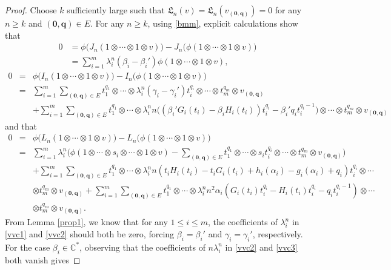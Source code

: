 \documentclass[12pt,leqno,amscd,amsfonts,amssymb]{amsart}
\def\a{\alpha}
\def\b{\beta}
\def\r{\gamma}
\def\C{\mathbb{C}}
\numberwithin{equation}{section}
\begin{document}
\begin{proof}
Choose  $k$ sufficiently large such that $\mathfrak L_n(v)=\mathfrak L_n(v_{(\mathbf{0}, \mathbf{q})})=0$ for any $n\geq k$ and $(\mathbf{0}, \mathbf{q})\in E$. For any $n\geq k$,  using \eqref{bmm}, explicit calculations show that    
\begin{align}\label{vvc1}
0&=\phi\big(J_n(1\otimes\cdots \otimes1 \otimes v)\big)-J_n\big(\phi(1\otimes\cdots \otimes1 \otimes v)\big)\nonumber\\
&=\sum_{i=1}^m\lambda_i^n (\b_{i}-\b_{i}')\phi(1\otimes\cdots \otimes  1\otimes v),
\end{align}
\begin{eqnarray}\label{vvc2}
0&=&\phi\big(I_n(1\otimes\cdots \otimes1 \otimes v)\big)-I_n\big(\phi(1\otimes\cdots \otimes1 \otimes v)\big)\nonumber\\
&=&\sum_{i=1}^m\sum_{(\mathbf{0}, \mathbf{q})\in E}t_1^{q_1}\otimes\cdots\otimes
\lambda_i^n(\r_i-\r_{i}')t_i^{q_i}\otimes\cdots \otimes t_{m}^{q_m} \otimes v_{(\mathbf{0}, \mathbf{q})}\nonumber\\
&&+\sum_{i=1}^m\sum_{(\mathbf{0}, \mathbf{q})\in E}t_1^{q_1}\otimes\cdots\otimes
\lambda_i^n n\big((\b_{i}'G_{i}(t_{i})-\b_{i}H_{i}(t_{i}))t_i^{q_i}-\b_{i}'q_{i}t_{i}^{q_i-1}\big)\otimes\cdots \otimes t_{m}^{q_m} \otimes v_{(\mathbf{0}, \mathbf{q})}
\end{eqnarray}
and that
\begin{eqnarray}\label{vvc3}
0 &=&\phi\bigl(L_n(1\otimes\cdots \otimes 1\otimes v)\bigr)-L_n\big(\phi(1\otimes\cdots \otimes 1\otimes v)\big) \nonumber \\
&=&\sum_{i=1}^m \lambda_i^n \big(\phi(1\otimes\cdots \otimes s_i\otimes\cdots \otimes 1\otimes v)-\sum_{(\mathbf{0}, \mathbf{q})\in E}t_1^{q_1}\otimes\cdots\otimes s_it_{i}^{q_i}
\otimes\cdots \otimes t_{m}^{q_m} \otimes v_{(\mathbf{0}, \mathbf{q})}\big)\nonumber\\
&&+\sum_{i=1}^m\sum_{(\mathbf{0}, \mathbf{q})\in E}t_1^{q_1}\otimes\cdots\otimes
\lambda_i^n n(t_iH_i(t_i)-t_iG_i(t_i)+h_i(\a_i)-g_i(\a_i)+q_i)t_i^{q_i}\otimes\cdots\nonumber\\
&&\otimes t_{m}^{q_m} \otimes v_{(\mathbf{0}, \mathbf{q})}+\sum_{i=1}^m\sum_{(\mathbf{0}, \mathbf{q})\in E}t_1^{q_1}\otimes\cdots\otimes\lambda_i^n n^2\a_i(G_i(t_i)t_i^{q_i}-H_i(t_i)t_i^{q_i}-q_it_i^{q_i-1})\otimes\cdots\nonumber\\
&&\otimes t_{m}^{q_m} \otimes v_{(\mathbf{0}, \mathbf{q})}.
\end{eqnarray}
From Lemma \ref{prop1}, we know that for any $1\leq i \leq m$, the coefficients of $\lambda_i^n$ in \eqref{vvc1} and  \eqref{vvc2} should both be zero, forcing  $\b_i=\b_{i}'$ and $\r_i=\r_{i}'$, respectively.  For the case $\b_i\in\C^*$,  observing that  the coefficients of  $n\lambda_i^n$  in \eqref{vvc2} and  \eqref{vvc3} both vanish gives

\end{proof}
\end{document}
